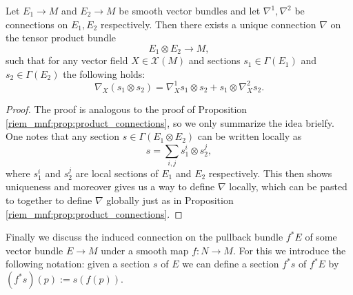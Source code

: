 \begin{proposition}
    Let $E_1 \to M$ and $E_2 \to M$ be smooth vector bundles and let $\nabla^1, \nabla^2$ be connections on $E_1,E_2$ respectively. Then there exists a unique connection $\nabla$ on the tensor product bundle
    \[
    E_1\otimes E_2 \to M,
    \]
    such that for any vector field $X \in \mathscr{X}(M)$ and sections $s_1 \in \Gamma(E_1)$ and $s_2 \in \Gamma(E_2)$ the following holds:
    \[
    \nabla_X (s_1 \otimes s_2) = \nabla^1_{X}s_1 \otimes s_2 + s_1 \otimes \nabla^2_{X}s_2.
    \]
\end{proposition}
\begin{proof}
    The proof is analogous to the proof of Proposition \ref{riem_mnf:prop:product_connections}, so we only summarize the idea brielfy. One notes that any section $s \in \Gamma(E_1 \otimes E_2)$ can be written locally as 
    \[
    s = \sum_{i,j} s_1^i \otimes s_2^j,
    \]
    where $s_1^i$ and $s_2^j$ are local sections of $E_1$ and $E_2$ respectively. This then shows uniqueness and moreover gives us a way to define $\nabla$ locally, which can be pasted to together to define $\nabla$ globally just as in Proposition \ref{riem_mnf:prop:product_connections}.
\end{proof}

Finally we discuss the induced connection on the pullback bundle $f^\ast E$ of some vector bundle $E \to M$ under a smooth map $f \colon N \to M$. For this we introduce the following notation: given a section $s$ of $E$ we can define a section $f^\ast s$ of $f^\ast E$ by $(f^\ast s)(p) := s(f(p))$. 

